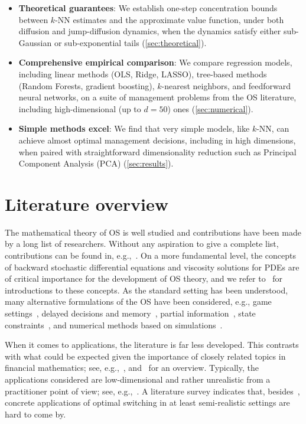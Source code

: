 \documentclass[11pt,reqno,a4paper]{amsart}
\theoremstyle{definition}
\numberwithin{equation}{section}
\DeclareMathOperator{\1}{\mathbbm{1}}
\begin{document}
\begin{itemize}
  \item \textbf{Theoretical guarantees}: We establish one-step concentration bounds between $k$-NN estimates and the approximate value function, under both diffusion and jump-diffusion dynamics, when the dynamics satisfy either sub-Gaussian or sub-exponential tails (\cref{sec:theoretical}).
  \item \textbf{Comprehensive empirical comparison}: We compare regression models, including linear methods (OLS, Ridge, LASSO), tree-based methods (Random Forests, gradient boosting), $k$-nearest neighbors, and feedforward neural networks, on a suite of management problems from the OS literature, including high-dimensional (up to $d=50$) ones (\cref{sec:numerical}).
  \item \textbf{Simple methods excel}: We find that very simple models, like $k$-NN, can achieve almost optimal management decisions, including in high dimensions, when paired with straightforward dimensionality reduction such as Principal Component Analysis (PCA) (\cref{sec:results}).
\end{itemize}

\section{Literature overview} \label{sec:literature}
The mathematical theory of OS is well studied and contributions have been made by a long list of researchers. Without any aspiration to give a complete list, contributions can be found in, e.g.,~\cite{barkhudaryan2022system,biswas2010viscosity,djehiche2009finite,el2017viscosity,el2009finite,HM13,hu2010multi,K16,lundstrom2014systems,lundstrom2014systems2,lundstrom2022systems,martyr2016dynamic,perninge2018limited,perninge2020finite,perninge2021finite}.
On a more fundamental level, the concepts of backward stochastic differential equations and viscosity solutions for PDEs are of critical importance for the development of OS theory, and we refer to~\cite{CIL92,PP90,PP92} for introductions to these concepts.  As the standard setting has been understood, many alternative formulations of the OS have been considered, e.g., game settings~\cite{HMM19}, delayed decisions and memory~\cite{perninge2018limited,perninge2020finite}, partial information~\cite{LNO15,O18}, state constraints~\cite{K16}, and numerical methods based on simulations~\cite{ACLP12,LOO21}.

When it comes to applications, the literature is far less developed. This contrasts with what could be expected given the importance of closely related topics in financial mathematics; see, e.g.,~\cite{EPQ97}, and~\cite{PS06} for an overview. Typically, the applications considered are low-dimensional and rather unrealistic from a practitioner point of view; see, e.g.,~\cite{BO94,BS85}. A literature survey indicates that, besides~\cite{ACLP12,carmona2008pricing,CL10,LOO21}, concrete applications of optimal switching in at least semi-realistic settings are hard to come by.
\end{document}
